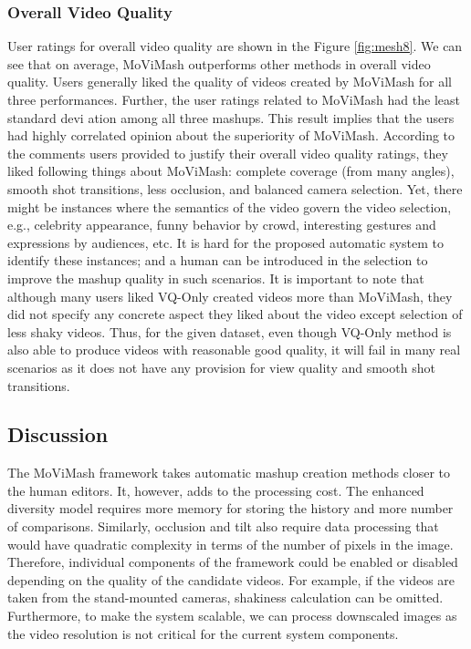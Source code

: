 \documentclass{sig-alternate}
\begin{document}
\subsubsection{Overall Video Quality}

User ratings for overall video quality are shown in the Figure \ref{fig:mesh8}.
We can see that on average, MoViMash outperforms other methods in overall video quality. Users generally liked the quality of
videos created by MoViMash for all three performances. Further,
the user ratings related to MoViMash had the least standard devi
ation among all three mashups. This result implies that the users
had highly correlated opinion about the superiority of MoViMash.
According to the comments users provided to justify their overall
video quality ratings, they liked following things about MoViMash:
complete coverage (from many angles), smooth shot transitions,
less occlusion, and balanced camera selection. Yet, there might
be instances where the semantics of the video govern the video
selection, e.g., celebrity appearance, funny behavior by crowd, interesting gestures and expressions by audiences, etc. It is hard for the proposed automatic system to identify these instances; and a
human can be introduced in the selection to improve the mashup
quality in such scenarios.
It is important to note that although many users liked VQ-Only
created videos more than MoViMash, they did not specify any concrete aspect they liked about the video except selection of less
shaky videos. Thus, for the given dataset, even though VQ-Only
method is also able to produce videos with reasonable good quality,
it will fail in many real scenarios as it does not have any provision
for view quality and smooth shot transitions.

\subsection{Discussion}

The MoViMash framework takes automatic mashup creation methods closer to the human editors. It, however, adds to the processing
cost. The enhanced diversity model requires more memory for storing the history and more number of comparisons. Similarly, occlusion and tilt also require data processing that would have quadratic
complexity in terms of the number of pixels in the image. Therefore, individual components of the framework could be enabled or
disabled depending on the quality of the candidate videos. For example, if the videos are taken from the stand-mounted cameras,
shakiness calculation can be omitted. Furthermore, to make the
system scalable, we can process downscaled images as the video
resolution is not critical for the current system components.
\end{document}
